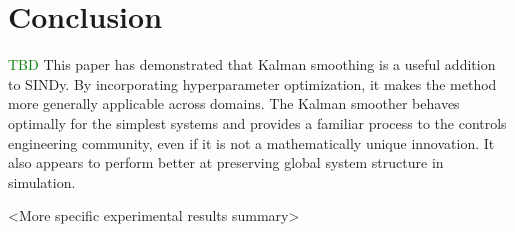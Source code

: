 \documentclass{article}
\newcommand{\green}[1]{\textcolor{green}{#1}}
\begin{document}
\section{Conclusion}
\green{TBD}
This paper has demonstrated that Kalman smoothing is a useful addition to SINDy.  By incorporating hyperparameter optimization, it makes the method more generally applicable across domains. The Kalman smoother behaves optimally for the simplest systems and provides a familiar process to the controls engineering community, even if it is not a mathematically unique innovation.  It also appears to perform better at preserving global system structure in simulation.

<More specific experimental results summary>
\end{document}
